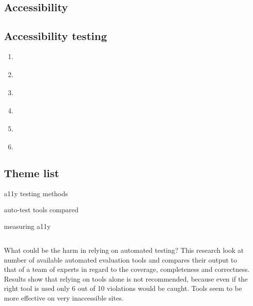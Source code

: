 \documentclass{master_thesis}
\begin{document}
\subsection*{Accessibility}
\subsection*{Accessibility testing}
\begin{enumerate}
	\item \cite{DequeSystems2021}
	\item \cite{AbouZahra2017}
	\item \cite{Sane2021}
	\item \cite{Thornton2022}
	\item \cite{RybinKoob2022}
	\item \cite{Ismailova2022}
\end{enumerate}

\subsection*{Theme list}
\begin{list}{-}{}
	\item a11y testing methods
	\item auto-test tools compared
	\item measuring a11y
\end{list}

\subsection*{\citep{Vigo2013}}
What could be the harm in relying on automated testing? This research look at number of available automated evaluation tools and compares their output to that of a team of experts in regard to the coverage, completeness and correctness. Results show that relying on tools alone is not recommended, because even if the right tool is used only 6 out of 10 violations would be caught. Tools seem to be more effective on very inaccessible sites.


\printbibliography
\end{document}
